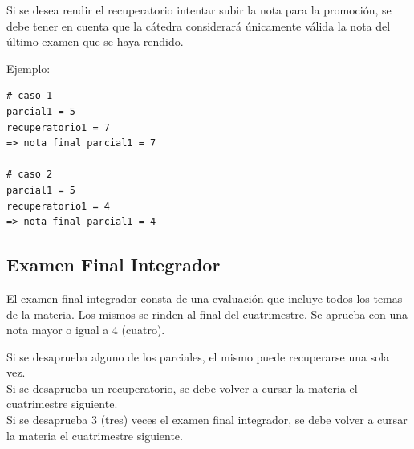 \documentclass[
  letterpaper,
  DIV=11,
  numbers=noendperiod]{scrreprt}
\begin{document}
\begin{tcolorbox}[enhanced jigsaw, bottomrule=.15mm, leftrule=.75mm, opacityback=0, colback=white, toprule=.15mm, bottomtitle=1mm, opacitybacktitle=0.6, rightrule=.15mm, left=2mm, arc=.35mm, coltitle=black, title=\textcolor{quarto-callout-tip-color}{\faLightbulb}\hspace{0.5em}{Rendir Recuperatorios para Promoción}, breakable, toptitle=1mm, colframe=quarto-callout-tip-color-frame, titlerule=0mm, colbacktitle=quarto-callout-tip-color!10!white]

Si se desea rendir el recuperatorio intentar subir la nota para la
promoción, se debe tener en cuenta que la cátedra considerará únicamente
válida la nota del último examen que se haya rendido.

Ejemplo:

\begin{verbatim}
# caso 1
parcial1 = 5
recuperatorio1 = 7
=> nota final parcial1 = 7

# caso 2
parcial1 = 5
recuperatorio1 = 4
=> nota final parcial1 = 4
\end{verbatim}

\end{tcolorbox}

\subsection*{Examen Final Integrador}\label{examen-final-integrador}

El examen final integrador consta de una evaluación que incluye todos
los temas de la materia. Los mismos se rinden al final del cuatrimestre.
Se aprueba con una nota mayor o igual a 4 (cuatro).

\begin{tcolorbox}[enhanced jigsaw, bottomrule=.15mm, leftrule=.75mm, opacityback=0, colback=white, toprule=.15mm, bottomtitle=1mm, opacitybacktitle=0.6, rightrule=.15mm, left=2mm, arc=.35mm, coltitle=black, title=\textcolor{quarto-callout-warning-color}{\faExclamationTriangle}\hspace{0.5em}{Desaprobación de la Materia}, breakable, toptitle=1mm, colframe=quarto-callout-warning-color-frame, titlerule=0mm, colbacktitle=quarto-callout-warning-color!10!white]

Si se desaprueba alguno de los parciales, el mismo puede recuperarse una
sola vez.\\
Si se desaprueba un recuperatorio, se debe volver a cursar la materia el
cuatrimestre siguiente.\\
Si se desaprueba 3 (tres) veces el examen final integrador, se debe
volver a cursar la materia el cuatrimestre siguiente.

\end{tcolorbox}
\end{document}
